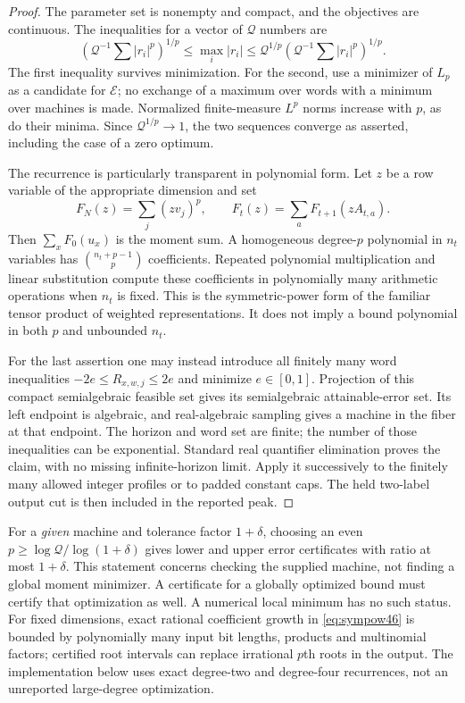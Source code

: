 \begin{proof}
The parameter set is nonempty and compact, and the objectives are
continuous. The inequalities for a vector of $\mathcal Q$ numbers are
\[
 \left(\mathcal Q^{-1}\sum |r_i|^p\right)^{1/p}
 \le\max_i|r_i|\le
 \mathcal Q^{1/p}\left(\mathcal Q^{-1}\sum |r_i|^p\right)^{1/p}.
\]
The first inequality survives minimization. For the second, use a
minimizer of $L_p$ as a candidate for $\mathcal E$; no exchange of a
maximum over words with a minimum over machines is made. Normalized
finite-measure $L^p$ norms increase with $p$, as do their minima.
Since $\mathcal Q^{1/p}\to1$, the two sequences converge as asserted, including
the case of a zero optimum.

The recurrence is particularly transparent in polynomial form. Let
$z$ be a row variable of the appropriate dimension and set
\begin{equation}\label{eq:sympow46}
 F_N(z)=\sum_j(zv_j)^p,\qquad
 F_t(z)=\sum_a F_{t+1}(zA_{t,a}).
\end{equation}
Then $\sum_xF_0(u_x)$ is the moment sum. A homogeneous degree-$p$
polynomial in $n_t$ variables has $\binom{n_t+p-1}{p}$ coefficients.
Repeated polynomial multiplication and linear substitution compute
these coefficients in polynomially many arithmetic operations when
$n_t$ is fixed. This is the symmetric-power form of the familiar tensor
product of weighted representations. It does not imply a bound
polynomial in both $p$ and unbounded $n_t$.

For the last assertion one may instead introduce all finitely many
word inequalities $-2e\le R_{x,w,j}\le2e$ and minimize $e\in[0,1]$.
Projection of this compact semialgebraic feasible set gives its
semialgebraic attainable-error set. Its left endpoint is algebraic,
and real-algebraic sampling gives a machine in the fiber at that endpoint.
The horizon and word set are finite; the number of those inequalities
can be exponential. Standard real quantifier elimination proves the
claim, with no missing infinite-horizon limit. Apply it successively
to the finitely many allowed integer profiles or to padded constant
caps. The held two-label output cut is then included in the reported
peak.\qedhere
\end{proof}

For a \emph{given} machine and tolerance factor $1+\delta$, choosing
an even $p\ge\log\mathcal Q/\log(1+\delta)$ gives lower and upper error
certificates with ratio at most $1+\delta$. This statement concerns
checking the supplied machine, not finding a global moment minimizer.
A certificate for a globally optimized bound must certify that
optimization as well. A numerical local minimum has no such status.
For fixed dimensions, exact rational coefficient growth in
\eqref{eq:sympow46} is bounded by polynomially many input bit lengths,
products and multinomial factors; certified root intervals can replace
irrational $p$th roots in the output. The implementation below uses
exact degree-two and degree-four recurrences, not an unreported
large-degree optimization.

